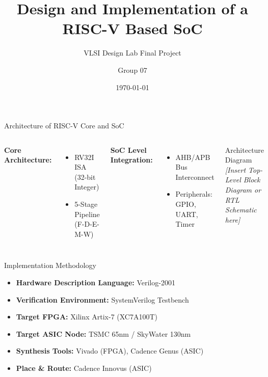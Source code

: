\documentclass[10pt]{beamer}
\title{Design and Implementation of a RISC-V Based SoC}
\subtitle{VLSI Design Lab Final Project}
\date{\today}
\author{Group 07}
\institute{Department of Electrical Engineering}
\begin{document}
\maketitle

\begin{frame}{Architecture of RISC-V Core and SoC}
    \begin{columns}
        \textbf{Core Architecture:}
        \begin{itemize}
            \item RV32I ISA (32-bit Integer)
            \item 5-Stage Pipeline (F-D-E-M-W)
        \end{itemize}
        \vspace{1em}
        \textbf{SoC Level Integration:}
        \begin{itemize}
            \item AHB/APB Bus Interconnect
            \item Peripherals: GPIO, UART, Timer
        \end{itemize}
        
        \begin{block}{Architecture Diagram}
            \textit{[Insert Top-Level Block Diagram or RTL Schematic here]}
        \end{block}
    \end{columns}
\end{frame}

\begin{frame}{Implementation Methodology}
    \begin{itemize}
        \item \textbf{Hardware Description Language:} Verilog-2001
        \item \textbf{Verification Environment:} SystemVerilog Testbench
        \item \textbf{Target FPGA:} Xilinx Artix-7 (XC7A100T)
        \item \textbf{Target ASIC Node:} TSMC 65nm / SkyWater 130nm
        \item \textbf{Synthesis Tools:} Vivado (FPGA), Cadence Genus (ASIC)
        \item \textbf{Place \& Route:} Cadence Innovus (ASIC)
    \end{itemize}
\end{frame}
\end{document}

